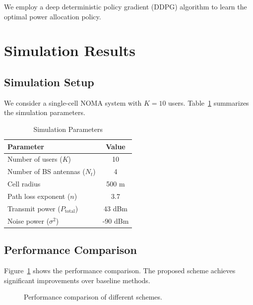 \documentclass[journal]{IEEEtran}
\begin{document}
We employ a deep deterministic policy gradient (DDPG) algorithm to learn the
optimal power allocation policy.


\section{Simulation Results}
\label{sec:results}

\subsection{Simulation Setup}

We consider a single-cell NOMA system with $K=10$ users. Table~\ref{tab:parameters}
summarizes the simulation parameters.

\begin{table}[htbp]
\centering
\caption{Simulation Parameters}
\label{tab:parameters}
\begin{tabular}{lc}
\hline
Parameter & Value \\
\hline
Number of users ($K$) & 10 \\
Number of BS antennas ($N_t$) & 4 \\
Cell radius & 500 m \\
Path loss exponent ($n$) & 3.7 \\
Transmit power ($P_{\mathrm{total}}$) & 43 dBm \\
Noise power ($\sigma^2$) & -90 dBm \\
\hline
\end{tabular}
\end{table}

\subsection{Performance Comparison}

Figure~\ref{fig:results} shows the performance comparison. The proposed scheme
achieves significant improvements over baseline methods.

\begin{figure}[htbp]
\centering
\caption{Performance comparison of different schemes.}
\label{fig:results}
\end{figure}
\end{document}

